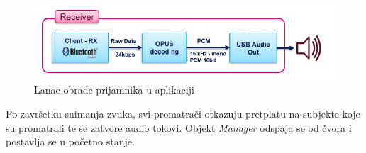 \begin{figure}[ht]
	\includegraphics[width=\linewidth]{imgs/duplex_chain_2}
	\caption{Lanac obrade prijamnika u aplikaciji \cite{fpaudbvlink}}
	\label{fig:duplex_chain_2}
\end{figure}

Po završetku snimanja zvuka, svi promatrači otkazuju pretplatu na subjekte koje su promatrali te se zatvore audio tokovi. Objekt \textit{Manager} odspaja se od čvora i postavlja se u početno stanje.